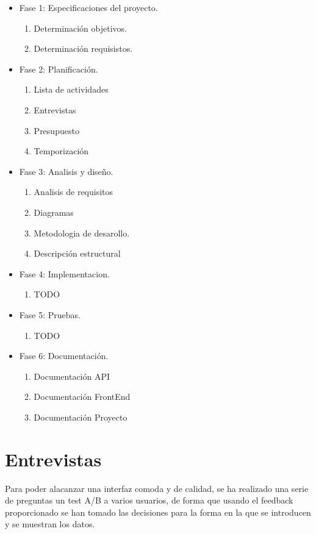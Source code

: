 \begin{itemize}
  \item Fase 1: Especificaciones del proyecto.
    \begin{enumerate}
      \item Determinación objetivos.
      \item Determinación requisistos.
    \end{enumerate}
  \item Fase 2: Planificación.
    \begin{enumerate}
      \item Lista de actividades
      \item Entrevistas
      \item Presupuesto
      \item Temporización
    \end{enumerate}
  \item Fase 3: Analisis y diseño.
    \begin{enumerate}
      \item Analisis de requisitos
      \item Diagramas
      \item Metodologia de desarollo.
      \item Descripción estructural
    \end{enumerate}
  \item Fase 4: Implementacion.
    \begin{enumerate}
      \item TODO
    \end{enumerate}
  \item Fase 5: Pruebas.
    \begin{enumerate}
      \item TODO
    \end{enumerate}
  \item Fase 6: Documentación.
    \begin{enumerate}
      \item Documentación API
      \item Documentación FrontEnd
      \item Documentación Proyecto
    \end{enumerate}
\end{itemize}


\section {Entrevistas}
Para poder alacanzar una interfaz comoda y de calidad, se ha realizado una serie de preguntas un test A/B a varios usuarios, de forma que usando el feedback proporcionado se han tomado las decisiones para la forma en la que se introducen y se muestran los datos.

